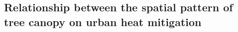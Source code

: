 \documentclass[10pt,letterpaper]{article}
\begin{document}



\subsection*{Relationship between the spatial pattern of tree canopy on urban heat mitigation}
\end{document}
